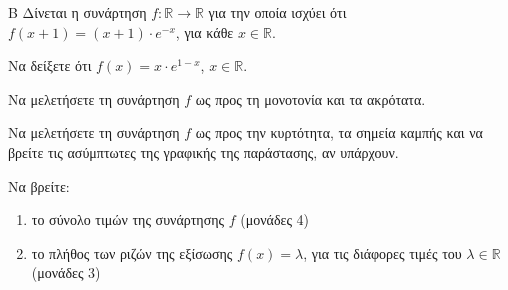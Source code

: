 \begin{thema}{Β}
Δίνεται η συνάρτηση $f: \mathbb{R} \to \mathbb{R}$ για την οποία ισχύει ότι $f(x+1) = (x+1) \cdot e^{-x}$, για κάθε $x \in \mathbb{R}$.
\begin{erwthma}
    \item Να δείξετε ότι $f(x) = x \cdot e^{1-x}$, $x \in \mathbb{R}$. 

    \item Να μελετήσετε τη συνάρτηση $f$ ως προς τη μονοτονία και τα ακρότατα. 

    \item Να μελετήσετε τη συνάρτηση $f$ ως προς την κυρτότητα, τα σημεία καμπής και να βρείτε τις ασύμπτωτες της γραφικής της παράστασης, αν υπάρχουν. 

    \item Να βρείτε:
    \begin{enumerate}[label=(\roman*)]
        \item το σύνολο τιμών της συνάρτησης $f$ \hfill (μονάδες 4)
        \item το πλήθος των ριζών της εξίσωσης $f(x) = \lambda$, για τις διάφορες τιμές του $\lambda \in \mathbb{R}$ \hfill (μονάδες 3)
    \end{enumerate}
\end{erwthma}
\end{thema}

